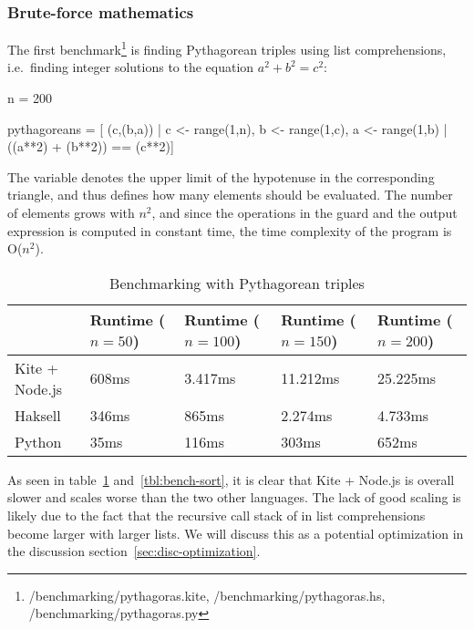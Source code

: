 \subsubsection{Brute-force mathematics}
\label{sec:math-benchmark}
The first benchmark\footnote{/benchmarking/pythagoras.kite, /benchmarking/pythagoras.hs, /benchmarking/pythagoras.py} is finding Pythagorean triples using list comprehensions, i.e.\ finding integer solutions to the equation $a^2 + b^2 = c^2$:

\begin{kite}
n = 200

pythagoreans = [ (c,(b,a)) | c <- range(1,n), b <- range(1,c),
      a <- range(1,b) | ((a**2) + (b**2)) == (c**2)]
\end{kite}

The variable  denotes the upper limit of the hypotenuse in the corresponding triangle, and thus defines how many elements should be evaluated. The number of elements grows with $n^2$, and since the operations in the guard and the output expression is computed in constant time, the time complexity of the program is O($n^2$).

\begin{table}[h]
  \centering
  \begin{tabular}{|l|l|l|l|l|}
    \hline
                   & Runtime ($n = 50$) & Runtime ($n = 100$) & Runtime ($n = 150$) & Runtime ($n = 200$) \\
    \hline
    Kite + Node.js & 608ms              & 3.417ms             & 11.212ms            & 25.225ms            \\
    Haksell        & 346ms              & 865ms               & 2.274ms             & 4.733ms             \\
    Python         & 35ms               & 116ms               & 303ms               & 652ms               \\
    \hline
  \end{tabular}
  \caption{Benchmarking with Pythagorean triples}
\label{tbl:bench-pythagoras}
\end{table}

As seen in table~\ref{tbl:bench-pythagoras} and~\ref{tbl:bench-sort}, it is clear that Kite + Node.js is overall slower and scales worse than the two other languages. The lack of good scaling is likely due to the fact that the recursive call stack of  in list comprehensions become larger with larger lists. We will discuss this as a potential optimization in the discussion section~\ref{sec:disc-optimization}.

